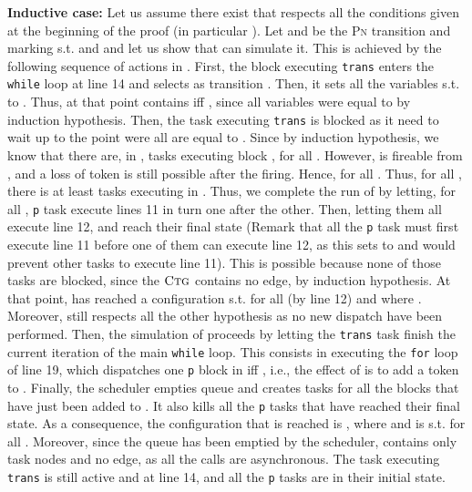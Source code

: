 \documentclass[runningheads,oribibl,]{article}
\newcommand{\pn}{\textsc{Pn}\xspace}
\newcommand{\ctg}{\ensuremath{\textsc{Ctg}}\xspace}
\newenvironment{proof}{\noindent{\it Proof.\hspace*{.5cm}}}{}
\newcommand{\qed}{\hfill}
\begin{document}
\begin{proof}
  \textbf{Inductive case: } Let us assume there exist
   that respects all the
  conditions given at the beginning of the proof (in particular
  ). Let  and  be the \pn transition
  and marking s.t. \smash{} and
   and let us show that  can simulate it. This
  is achieved by the following sequence of actions in . First,
  the block executing \texttt{trans} enters the \texttt{while} loop at
  line 14 and selects  as transition . Then, it sets all the
  variables  s.t.  to . Thus, at that point
   contains  iff , since all  variables
  were equal to  by induction hypothesis. Then, the task executing
  \texttt{trans} is blocked as it need to wait up to the point were
  all  are equal to . Since  by induction
  hypothesis, we know that there are, in ,  tasks
  executing block , for all . However,  is
  fireable from , and a loss of  token is still
  possible after the firing. Hence,  for all . Thus, for all ,
  there is at least  tasks executing
   in . Thus, we complete the run of  by
  letting, for all ,  \texttt{p}
  task execute lines 11 in turn one after the other. Then, letting
  them all execute line 12, and reach their final state (Remark that
  all the \texttt{p} task must first execute line 11 before one of
  them can execute line 12, as this sets  to  and would
  prevent other tasks to execute line 11). This is possible because
  none of those tasks are blocked, since the \ctg contains no edge, by
  induction hypothesis. At that point,  has reached a
  configuration  s.t.  for all 
  (by line 12) and where . Moreover,  still respects all
  the other hypothesis as no new dispatch have been performed. Then,
  the simulation of  proceeds by letting the \texttt{trans} task
  finish the current iteration of the main \texttt{while} loop. This
  consists in executing the \texttt{for} loop of line 19, which
  dispatches one \texttt{p} block in  iff , i.e., the
  effect of  is to add a token to . Finally, the scheduler
  empties queue  and creates tasks for all the blocks that have
  just been added to . It also kills all the \texttt{p} tasks that
  have reached their final state. As a consequence, the configuration
  that is reached is , where 
  and  is s.t.  for all . Moreover,
  since the queue has been emptied by the scheduler,  contains
  only task nodes and no edge, as all the calls are asynchronous. The
  task executing \texttt{trans} is still active and at line 14, and
  all the \texttt{p} tasks are in their initial state.\qed
\end{proof}
\end{document}
